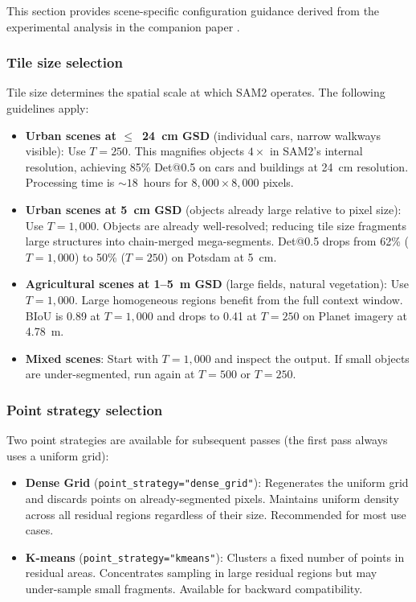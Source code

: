\documentclass[review,11pt,authoryear]{elsarticle}
\begin{document}
This section provides scene-specific configuration guidance derived from the experimental analysis in the companion paper \citep{carvalho2026jag}.

\subsubsection{Tile size selection}

Tile size determines the spatial scale at which SAM2 operates. The following guidelines apply:

\begin{itemize}
    \item \textbf{Urban scenes at $\leq$~24~cm GSD} (individual cars, narrow walkways visible): Use $T = 250$. This magnifies objects $4\times$ in SAM2's internal resolution, achieving 85\% Det@0.5 on cars and buildings at 24~cm resolution. Processing time is ${\sim}18$~hours for $8{,}000 \times 8{,}000$ pixels.

    \item \textbf{Urban scenes at 5~cm GSD} (objects already large relative to pixel size): Use $T = 1{,}000$. Objects are already well-resolved; reducing tile size fragments large structures into chain-merged mega-segments. Det@0.5 drops from 62\% ($T = 1{,}000$) to 50\% ($T = 250$) on Potsdam at 5~cm.

    \item \textbf{Agricultural scenes at 1--5~m GSD} (large fields, natural vegetation): Use $T = 1{,}000$. Large homogeneous regions benefit from the full context window. BIoU is 0.89 at $T = 1{,}000$ and drops to 0.41 at $T = 250$ on Planet imagery at 4.78~m.

    \item \textbf{Mixed scenes}: Start with $T = 1{,}000$ and inspect the output. If small objects are under-segmented, run again at $T = 500$ or $T = 250$.
\end{itemize}

\subsubsection{Point strategy selection}

Two point strategies are available for subsequent passes (the first pass always uses a uniform grid):

\begin{itemize}
    \item \textbf{Dense Grid} (\texttt{point\_strategy="dense\_grid"}): Regenerates the uniform grid and discards points on already-segmented pixels. Maintains uniform density across all residual regions regardless of their size. Recommended for most use cases.

    \item \textbf{K-means} (\texttt{point\_strategy="kmeans"}): Clusters a fixed number of points in residual areas. Concentrates sampling in large residual regions but may under-sample small fragments. Available for backward compatibility.
\end{itemize}
\end{document}
